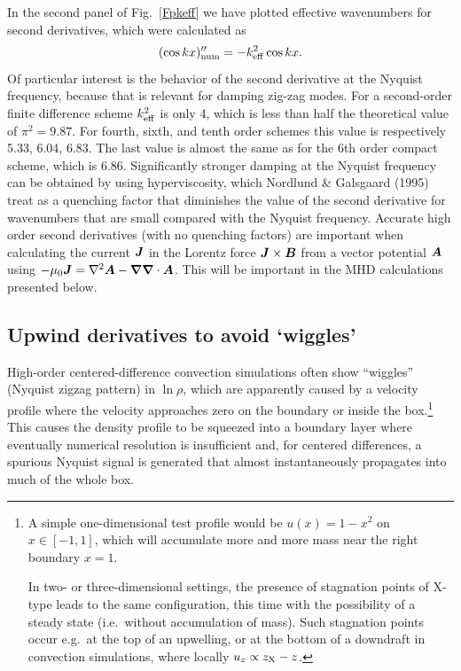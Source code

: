 \documentclass[\mydriver,12pt,twoside,notitlepage,a4paper]{article}
\renewcommand{\vec}[1]{\mbox{\boldmath{$#1$}}}
\newcommand{\Av}            {\vec{A}}
\newcommand{\Bv}            {\vec{B}}
\newcommand{\Jv}            {\vec{J}}
\newcommand{\nab}{\mbox{\boldmath $\nabla$} {}}
\begin{document}
In the second panel of Fig.~\ref{Fpkeff} we have plotted effective
wavenumbers for second derivatives, which were calculated as
\begin{equation}
(\cos kx)''_{\rm num}=-k_{\rm eff}^2\cos kx.
\end{equation}
Of particular interest is the behavior of the second derivative at the
Nyquist frequency, because that is relevant for damping zig-zag modes.
For a second-order finite difference scheme $k_{\rm eff}^2$ is only 4,
which is less than half the theoretical value of $\pi^2=9.87$. For fourth,
sixth, and tenth order schemes this value is respectively 5.33, 6.04,
6.83. The last value is almost the same as for the 6th order compact
scheme, which is 6.86. Significantly stronger damping at the Nyquist
frequency can be obtained by using hyperviscosity, which Nordlund \&
Galsgaard (1995) treat as a quenching factor that diminishes the value
of the second derivative for wavenumbers that are small compared with
the Nyquist frequency. Accurate high order second derivatives (with no
quenching factors) are important when calculating the current $\Jv$ in
the Lorentz force $\Jv\times\Bv$ from a vector potential $\Av$ using
$-\mu_0\Jv=\nabla^2\Av-\nab\nab\cdot\Av$. This will be important in
the MHD calculations presented below. 


\subsection{Upwind derivatives to avoid `wiggles'}
\label{S-upwind}
\newcommand{\Order}[1]{O\left(#1\right)}

High-order centered-difference convection simulations often show
``wiggles'' (Nyquist zigzag pattern) in $\ln\rho$, which are apparently
caused by a velocity profile where the velocity approaches zero on the
boundary or inside the box.\footnote{%
  A simple one-dimensional test profile would be $u(x) = 1-x^2$ on $x \in
  [-1,1]$, which will accumulate more and more mass near the right
  boundary $x=1$.

  In two- or three-dimensional settings, the presence of stagnation points
  of X-type leads to the same configuration, this time with the
  possibility of a steady state (i.e.~without accumulation of mass).
  Such stagnation points occur e.g.~at the top of an upwelling, or at
  the bottom of a downdraft in convection simulations, where locally
  $u_z \propto z_{\rm X}-z$.
}
This causes the density profile to be squeezed into a boundary layer where
eventually numerical resolution is insufficient and, for centered
differences, a spurious Nyquist signal is generated that almost
instantaneously propagates into much of the whole box.
\end{document}
